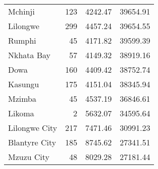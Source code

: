 \begin{tabular}{lrrr}
Mchinji       &     123 &        4242.47 &            39654.91 \\
Lilongwe      &     299 &        4457.24 &            39654.55 \\
Rumphi        &      45 &        4171.82 &            39599.39 \\
Nkhata Bay    &      57 &        4149.32 &            38919.16 \\
Dowa          &     160 &        4409.42 &            38752.74 \\
Kasungu       &     175 &        4151.04 &            38345.94 \\
Mzimba        &      45 &        4537.19 &            36846.61 \\
Likoma        &       2 &        5632.07 &            34595.64 \\
Lilongwe City &     217 &        7471.46 &            30991.23 \\
Blantyre City &     185 &        8745.62 &            27341.51 \\
Mzuzu City    &      48 &        8029.28 &            27181.44 \\
\bottomrule
\end{tabular}
